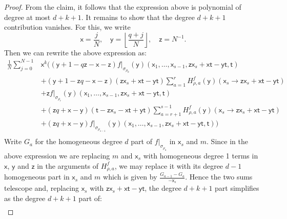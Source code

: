 \documentclass[11pt]{article}
\theoremstyle{definition}
\begin{document}
\begin{proof}
	From the claim, it follows that the expression above is polynomial
	of degree at most $d+k+1$. It remains to show that the degree
	$d+k+1$ contribution vanishes. For this, we write
	$$\mathsf{x}=\frac{j}{N},\quad \mathsf{y}=\left\lfloor \frac{q+j}{N}\right\rfloor,\quad \mathsf{z}=N^{-1}.$$
	Then we can rewrite the above expression as:
	{\allowdisplaybreaks
    \begin{align*}
		\frac{1}{N}\sum_{j=0}^{N-1}&\mathsf{x}^{k}\biggl((\mathsf{y}+1-q\mathsf{z}-\mathsf{x}-\mathsf{z})f|_{\sigma_{\rho_0}}\left(\mathsf{y}\right)\left(\mathsf{x}_1,\dots,\mathsf{x}_{s-1},\mathsf{z}\mathsf{x}_s+\mathsf{x}\mathsf{t}-\mathsf{y} \mathsf{t},\mathsf{t}\right)\\
			&+\left(\mathsf{y}+1-\mathsf{z}q-\mathsf{x}-\mathsf{z}\right)\left(\mathsf{z}\mathsf{x}_s+\mathsf{x}\mathsf{t}-\mathsf{y} \mathsf{t}\right)\sum_{a=1}^{r}H_{\rho,a}^f\left(\mathsf{y}\right)\left(\mathsf{x}_s\to \mathsf{z}\mathsf{x}_s+\mathsf{x}\mathsf{t}-\mathsf{y} \mathsf{t}\right)\\
		    &+\mathsf{z}f|_{\sigma_{\rho_r}}\left(\mathsf{y}\right)\left(\mathsf{x}_1,\dots,\mathsf{x}_{s-1},\mathsf{z}\mathsf{x}_s+\mathsf{x}\mathsf{t}-\mathsf{y} \mathsf{t},\mathsf{t}\right)\\
			&+\left(\mathsf{z}q+\mathsf{x}-\mathsf{y}\right)\left(\mathsf{t}-\mathsf{z}\mathsf{x}_s-\mathsf{x}\mathsf{t}+\mathsf{y} \mathsf{t}\right)\sum_{a=r+1}^{s-1}H_{\rho,a}^f\left(\mathsf{y}\right)\left(\mathsf{x}_s\to \mathsf{z}\mathsf{x}_s+\mathsf{x}\mathsf{t}-\mathsf{y} \mathsf{t}\right)\\
			&+(\mathsf{z}q+\mathsf{x}-\mathsf{y})f|_{\sigma_{\rho_{s-1}}}\left(\mathsf{y}\right)\left(\mathsf{x}_1,\dots,\mathsf{x}_{s-1},\mathsf{z}\mathsf{x}_s+\mathsf{x}\mathsf{t}-\mathsf{y} \mathsf{t},\mathsf{t}\right)\biggr)\\
	\end{align*}}
	Write $G_a$ for the homogeneous degree $d$ part of $f|_{{\sigma}_{\rho_a}}$
	in $\mathsf{x}_s$ and $m$. Since in the above expression we are replacing
	$m$ and $\mathsf{x}_s$ with homogeneous degree 1 terms in $\mathsf{x}$, $\mathsf{y}$ and
	$\mathsf{z}$ in the arguments of $H_{\rho,a}^{f}$, we may replace it
	with its degree $d-1$ homogeneous part in $\mathsf{x}_s$ and $m$ which
	is given by $\frac{G_{a-1}-G_a}{-\mathsf{x}_s}$. Hence the two sums telescope and, replacing $\mathsf{x}_s$ with $\mathsf{z}\mathsf{x}_s+\mathsf{x}\mathsf{t}-\mathsf{y}\mathsf{t}$, the
	degree $d+k+1$ part simplifies as the degree $d+k+1$ part of:
    {\allowdisplaybreaks
	\begin{align*}

\end{align*}}
\end{proof}
\end{document}

